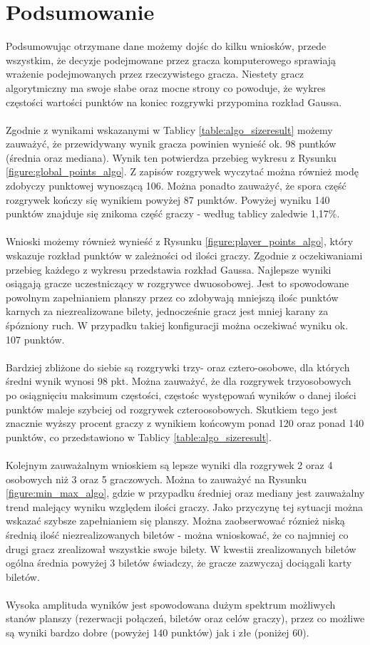 \documentclass[12pt, oneside]{report}
\begin{document}
\section{Podsumowanie} 
Podsumowując otrzymane dane możemy dojśc do kilku wniosków, przede wszystkim, że decyzje podejmowane przez gracza komputerowego sprawiają wrażenie podejmowanych przez rzeczywistego gracza. Niestety gracz algorytmiczny ma swoje słabe oraz mocne strony co powoduje, że wykres częstości wartości punktów na koniec rozgrywki przypomina rozkład Gaussa. \\ \\
Zgodnie z wynikami wskazanymi w Tablicy \ref{table:algo_sizeresult} możemy zauważyć, że przewidywany wynik gracza powinien wynieść ok. 98 puntków (średnia oraz mediana). Wynik ten potwierdza przebieg wykresu z Rysunku \ref{figure:global_points_algo}. Z zapisów rozgrywek wyczytać można również modę zdobyczy punktowej wynoszącą 106. Można  ponadto zauważyć, że spora część rozgrywek kończy się wynikiem powyżej 87 punktów. Powyżej wyniku 140 punktów znajduje się znikoma część graczy - według tablicy zaledwie 1,17\%. \\ \\ 
Wnioski możemy również wynieść z Rysunku \ref{figure:player_points_algo}, który wskazuje rozkład punktów w zależności od ilości graczy. Zgodnie z oczekiwaniami przebieg każdego z wykresu przedstawia rozkład Gaussa. Najlepsze wyniki osiągają gracze uczestniczący w rozgrywce dwuosobowej. Jest to spowodowane powolnym zapełnianiem planszy przez co zdobywają mniejszą ilośc punktów karnych za niezrealizowane bilety, jednocześnie gracz jest mniej karany za śpózniony ruch. W przypadku takiej konfiguracji można oczekiwać wyniku ok. 107 punktów. \\ \\ 
Bardziej zbliżone do siebie są rozgrywki trzy- oraz cztero-osobowe, dla których średni wynik wynosi 98 pkt. Można zauważyć, że dla rozgrywek trzyosobowych po osiągnięciu maksimum częstości, częstośc występowań wyników o danej ilości punktów maleje szybciej od rozgrywek czteroosobowych. Skutkiem tego jest znacznie wyższy procent graczy z wynikiem końcowym ponad 120 oraz ponad 140 punktów, co przedstawiono w Tablicy \ref{table:algo_sizeresult}. \\ \\
Kolejnym zauważalnym wnioskiem są lepsze wyniki dla rozgrywek 2 oraz 4 osobowych niż 3 oraz 5 graczowych. Można to zauważyć na Rysunku \ref{figure:min_max_algo}, gdzie w przypadku średniej oraz mediany jest zauważalny trend malejący wyniku względem ilości graczy. Jako przyczynę tej sytuacji można wskazać szybsze zapełnianiem się planszy. Można zaobserwować róznież niską średnią ilość niezrealizowanych biletów - można wnioskować, że co najmniej co drugi gracz zrealizował wszystkie swoje bilety. W kwestii zrealizowanych biletów ogólna średnia powyżej 3 biletów świadczy, że gracze zazwyczaj dociągali karty biletów. \\ \\
Wysoka amplituda wyników jest spowodowana dużym spektrum możliwych stanów planszy (rezerwacji połączeń, biletów oraz celów graczy), przez co możliwe są wyniki bardzo dobre (powyżej 140 punktów) jak i złe (poniżej 60). 
\end{document}
